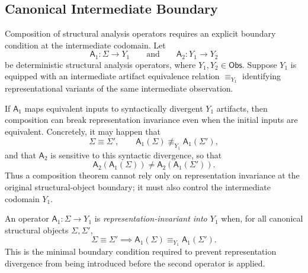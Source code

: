 \subsection*{Canonical Intermediate Boundary}

Composition of structural analysis operators requires an explicit boundary condition at the intermediate codomain.  Let
\[
\mathsf A_1:
\Sigma \to Y_1
\qquad\text{and}\qquad
\mathsf A_2:Y_1\to Y_2
\]
be deterministic structural analysis operators, where $Y_1,Y_2\in\mathsf{Obs}$.  Suppose $Y_1$ is equipped with an intermediate artifact equivalence relation $\equiv_{Y_1}$ identifying representational variants of the same intermediate observation.

\begin{remark}
\label{rem:intermediate-boundary-counterexample}
If $\mathsf A_1$ maps equivalent inputs to syntactically divergent $Y_1$ artifacts, then composition can break representation invariance even when the initial inputs are equivalent.  Concretely, it may happen that
\[
\Sigma\equiv\Sigma',
\qquad
\mathsf A_1(\Sigma)\not\equiv_{Y_1}\mathsf A_1(\Sigma'),
\]
and that $\mathsf A_2$ is sensitive to this syntactic divergence, so that
\[
\mathsf A_2(\mathsf A_1(\Sigma))\neq
\mathsf A_2(\mathsf A_1(\Sigma')).
\]
Thus a composition theorem cannot rely only on representation invariance at the original structural-object boundary; it must also control the intermediate codomain $Y_1$.
\end{remark}

\begin{definition}
\label{def:canonical-intermediate-boundary}
An operator $\mathsf A_1:\Sigma\to Y_1$ is \emph{representation-invariant into $Y_1$} when, for all canonical structural objects $\Sigma,\Sigma'$,
\[
\Sigma\equiv\Sigma'
\implies
\mathsf A_1(\Sigma)\equiv_{Y_1}\mathsf A_1(\Sigma').
\]
This is the minimal boundary condition required to prevent representation divergence from being introduced before the second operator is applied.
\end{definition}


